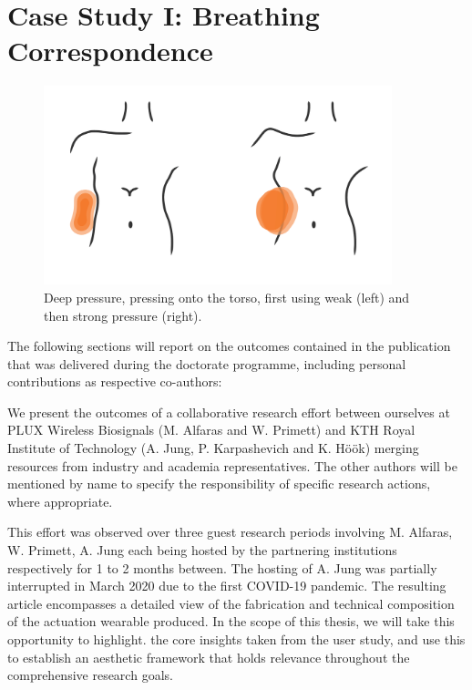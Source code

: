 \chapter{Case Study I: Breathing Correspondence}
\label{case_studies:soma_chi}

\begin{figure}
  \centering
  \includegraphics[width=0.9\textwidth]{Chapters/Figures/soma_chi/deep_pressure_graphic-01.png}
  \caption[Deep pressure, pressing onto the torso]{Deep pressure, pressing onto the torso, first using weak (left) and then strong pressure (right).}
  \label{fig:teaser}
\end{figure}

The following sections will report on the outcomes contained in the publication that was delivered during the doctorate programme, including personal contributions as respective co-authors:


We present the outcomes of a collaborative research effort between ourselves at PLUX Wireless Biosignals (M. Alfaras and W. Primett) and KTH Royal Institute of Technology (A. Jung, P. Karpashevich and K. Höök) merging resources from industry and academia representatives. The other authors will be mentioned by name to specify the responsibility of specific research actions, where appropriate.

This effort was observed over three guest research periods involving M. Alfaras, W. Primett, A. Jung each being hosted by the partnering institutions respectively for 1 to 2 months between. The hosting of A. Jung was partially interrupted in March 2020 due to the first COVID-19 pandemic. The resulting article encompasses a detailed view of the fabrication and technical composition of the actuation wearable produced. In the scope of this thesis, we will take this opportunity to highlight. the core insights taken from the user study, and use this to establish an aesthetic framework that holds relevance throughout the comprehensive research goals.


